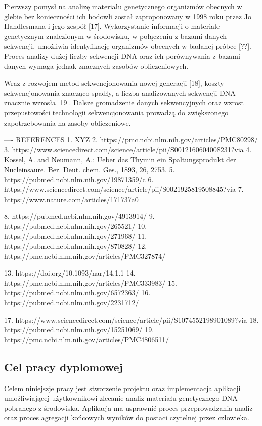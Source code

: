 Pierwszy pomysł na analizę materiału genetycznego organizmów obecnych w glebie bez 
konieczności ich hodowli został zaproponowany w 1998 roku przez Jo Handlesmana i 
jego zespół [17]. Wykorzystanie informacji o materiale genetycznym znalezionym w 
środowisku, w połączeniu z bazami danych sekwencji, umożliwia identyfikację organizmów 
obecnych w badanej próbce [??]. Proces analizy dużej liczby sekwencji DNA oraz ich 
porównywania z bazami danych wymaga jednak znacznych zasobów obliczeniowych.

Wraz z rozwojem metod sekwencjonowania nowej generacji [18], koszty sekwencjonowania 
znacząco spadły, a liczba analizowanych sekwencji DNA znacznie wzrosła [19]. Dalsze 
gromadzenie danych sekwencyjnych oraz wzrost przepustowości technologii sekwencjonowania 
prowadzą do zwiększonego zapotrzebowania na zasoby obliczeniowe.


---- REFERENCES 
1. XYZ
2. https://pmc.ncbi.nlm.nih.gov/articles/PMC80298/
3. https://www.sciencedirect.com/science/article/pii/S0012160604008231?via%
4. Kossel, A. and Neumann, A.: Ueber das Thymin ein Spaltungsprodukt der Nucleinsaure. Ber. Deut. chem. Ges., 1893, 26, 2753.
5. https://pubmed.ncbi.nlm.nih.gov/19871359/c
6. https://www.sciencedirect.com/science/article/pii/S0021925819508845?via%
7. https://www.nature.com/articles/171737a0

8. https://pubmed.ncbi.nlm.nih.gov/4913914/
9. https://pubmed.ncbi.nlm.nih.gov/265521/
10. https://pubmed.ncbi.nlm.nih.gov/271968/
11. https://pubmed.ncbi.nlm.nih.gov/870828/
12. https://pmc.ncbi.nlm.nih.gov/articles/PMC327874/

13. https://doi.org/10.1093/nar/14.1.1
14. https://pmc.ncbi.nlm.nih.gov/articles/PMC333983/
15. https://pubmed.ncbi.nlm.nih.gov/6572363/
16. https://pubmed.ncbi.nlm.nih.gov/2231712/

17. https://www.sciencedirect.com/science/article/pii/S1074552198901089?via%
18. https://pubmed.ncbi.nlm.nih.gov/15251069/
19. https://pmc.ncbi.nlm.nih.gov/articles/PMC4806511/



\subsection {
    Cel pracy dyplomowej
}

Celem niniejszje pracy jest stworzenie projektu oraz implementacja aplikacji 
umożliwiającej użytkownikowi zlecanie analiz materiału genetycznego DNA pobranego
z środowiska. Aplikacja ma usprawnić proces przeprowadzania analiz oraz proces 
agregacji końcowych wyników do postaci czytelnej przez człowieka.

